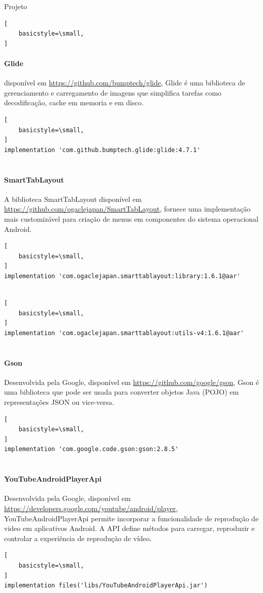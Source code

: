 \documentclass[
	12pt,				%
	openright,			%
	twoside,			%
	a4paper,			%
	english,			%
	french,				%
	spanish,			%
	brazil				%
	]{abntex2}
\begin{document}
\begin{chapter}{Projeto}
\begin{lstlisting}[
    basicstyle=\small,
]
\end{lstlisting}
\newpage
   \paragraph{Glide}
   disponível em \url{https://github.com/bumptech/glide}, Glide é uma biblioteca de gerenciamento e carregamento de imagens 
que simplifica tarefas como decodificação, cache em memoria e em disco. 
        \begin{lstlisting}[
    basicstyle=\small,
]
implementation 'com.github.bumptech.glide:glide:4.7.1'
  
\end{lstlisting}
   \paragraph{SmartTabLayout}
   A biblioteca SmartTabLayout disponível em \url{https://github.com/ogaclejapan/SmartTabLayout}, fornece uma implementação mais customizável 
para criação de menus em componentes do sistema operacional Android.
         \begin{lstlisting}[
    basicstyle=\small,
]
implementation 'com.ogaclejapan.smarttablayout:library:1.6.1@aar'
   
\end{lstlisting}
        \begin{lstlisting}[
    basicstyle=\small,
]
implementation 'com.ogaclejapan.smarttablayout:utils-v4:1.6.1@aar'
   
\end{lstlisting}
   \paragraph{Gson}
   Desenvolvida pela Google, disponível em \url{https://github.com/google/gson}, Gson é uma biblioteca que pode ser usada para converter objetos Java (POJO) em representações JSON ou vice-versa.
         \begin{lstlisting}[
    basicstyle=\small,
]
implementation 'com.google.code.gson:gson:2.8.5'
    
\end{lstlisting}
   \paragraph{YouTubeAndroidPlayerApi}
   Desenvolvida pela Google, disponível em \url{https://developers.google.com/youtube/android/player}, YouTubeAndroidPlayerApi permite incorporar a funcionalidade de reprodução de video em aplicativos Android. A API  define métodos para carregar, reproduzir 
e controlar a experiência de reprodução de vídeo.
      \begin{lstlisting}[
    basicstyle=\small,
]
implementation files('libs/YouTubeAndroidPlayerApi.jar')
   

\end{lstlisting}
\end{chapter}
\end{document}
